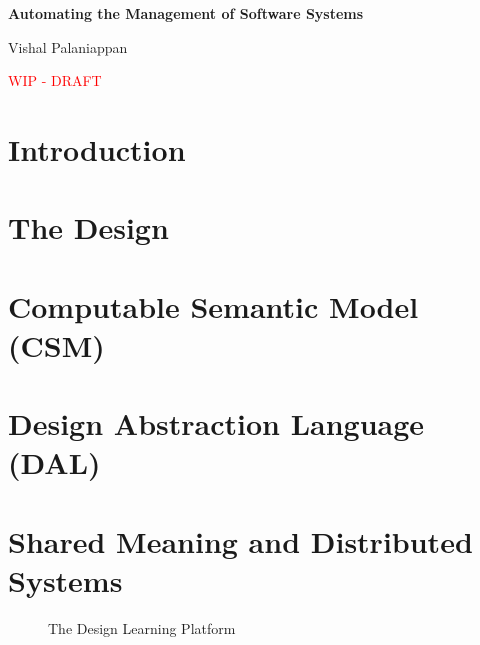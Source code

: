 \documentclass{article}
\begin{document}
\begin{titlepage}
    \centering
    \vspace*{\fill}

    {\Huge\bfseries Automating the Management of Software Systems\par}

     \vspace{1cm}

     {\Large Vishal Palaniappan\par}

     
     \vspace{6cm}
    
     {\Large \textcolor{red}{WIP - DRAFT}\par}


    \vspace*{\fill}
\end{titlepage}


\section{Introduction}



\section{The Design}


\section{Computable Semantic Model (CSM)}


\newpage
\section{Design Abstraction Language (DAL)}


\newpage
\section{Shared Meaning and Distributed Systems}



\begin{landscape}
    \begin{figure}[htbp]
        \centering
        
        \caption{The Design Learning Platform}
        \label{fig:dlp-diagram}
    \end{figure}
\end{landscape}
\end{document}

